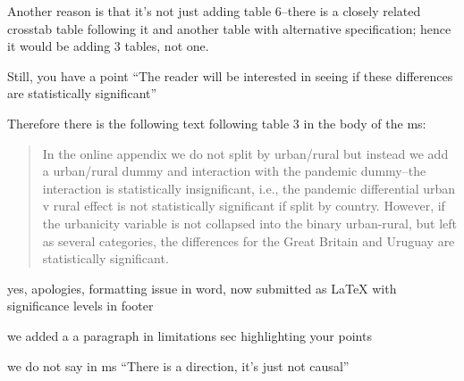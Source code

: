 Another reason is that it's not just adding table 6--there is a closely related
crosstab table following it and another table with alternative specification; hence it would be adding 3 tables, not one.

Still, you have a point ``The reader will be interested
in seeing if these differences are statistically significant''

Therefore there is the following text following table 3 in the body of the ms:

\begin{quote}
  In the online appendix we do not split by urban/rural but instead we add a urban/rural dummy and interaction with the
pandemic dummy--the interaction is statistically insignificant, i.e., the pandemic differential urban v rural effect is not
statistically significant if split by country. However, if the urbanicity variable is not collapsed into the binary urban-rural,
but left as several categories, the differences for the Great Britain and Uruguay are statistically significant.
\end{quote}


yes, apologies, formatting issue in word, now submitted as LaTeX with
significance levels in footer


we added a a paragraph in limitations sec highlighting your points

we do not say in ms ``There is a direction, it's just not causal''\\

